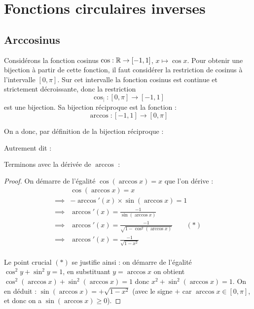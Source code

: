 \documentclass[class=report,crop=false]{standalone}
\begin{document}
\section{Fonctions circulaires inverses}

\subsection{Arccosinus}

Considérons la fonction cosinus $\cos : \mathbb{R} \to [-1,1]$, $x \mapsto \cos x$.
Pour obtenir une bijection à partir de cette fonction, il faut considérer la restriction
de cosinus à l'intervalle $[0,\pi]$. Sur cet intervalle la fonction cosinus est continue
et strictement décroissante, donc la restriction
$$\cos_| : [0,\pi] \to [-1,1]$$
est une bijection.
Sa bijection réciproque est la fonction  :
$$\arccos : [-1,1] \to [0,\pi]$$



On a donc, par définition de la bijection réciproque :

Autrement dit :

Terminons avec la dérivée de $\arccos$ :
\mybox{$\displaystyle \arccos'(x) = \frac{-1}{\sqrt{1-x^2}} \qquad \forall x \in ]-1,1[$}

\begin{proof}
On démarre de l'égalité $\cos(\arccos x) = x$ que l'on dérive :
\begin{align*}
          & \cos(\arccos x) = x \\
 \implies &  -\arccos'(x) \times  \sin(\arccos x) = 1 \\
 \implies &  \arccos'(x) = \frac{-1}{\sin(\arccos x)} \\
 \implies &  \arccos'(x) = \frac{-1}{\sqrt{1-\cos^2(\arccos x)}} \qquad (*) \\
 \implies &  \arccos'(x) = \frac{-1}{\sqrt{1-x^2}} \\
\end{align*}

Le point crucial $(*)$ se justifie ainsi :
on démarre de l'égalité $\cos^2 y + \sin^2 y = 1$,  en substituant $y= \arccos x$ on obtient $\cos^2(\arccos x)+ \sin^2(\arccos x) = 1$
donc $x^2+ \sin^2(\arccos x) = 1$. On en déduit : $\sin(\arccos x) = + \sqrt{1-x^2}$ (avec le signe $+$ car $\arccos x \in [0,\pi]$, et donc on a $\sin(\arccos x)\geq 0$).
\end{proof}
\end{document}
